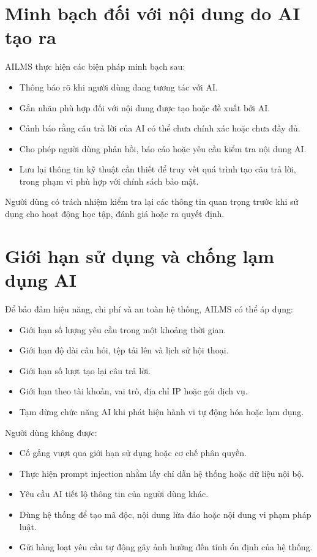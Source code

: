 \documentclass[12pt,a4paper]{article}
\begin{document}
\section{Minh bạch đối với nội dung do AI tạo ra}

AILMS thực hiện các biện pháp minh bạch sau:

\begin{itemize}
    \item Thông báo rõ khi người dùng đang tương tác với AI.
    \item Gắn nhãn phù hợp đối với nội dung được tạo hoặc đề xuất bởi AI.
    \item Cảnh báo rằng câu trả lời của AI có thể chưa chính xác hoặc chưa đầy đủ.
    \item Cho phép người dùng phản hồi, báo cáo hoặc yêu cầu kiểm tra nội dung AI.
    \item Lưu lại thông tin kỹ thuật cần thiết để truy vết quá trình tạo câu trả lời,
    trong phạm vi phù hợp với chính sách bảo mật.
\end{itemize}

Người dùng có trách nhiệm kiểm tra lại các thông tin quan trọng trước khi sử dụng
cho hoạt động học tập, đánh giá hoặc ra quyết định.

\section{Giới hạn sử dụng và chống lạm dụng AI}

Để bảo đảm hiệu năng, chi phí và an toàn hệ thống, AILMS có thể áp dụng:

\begin{itemize}
    \item Giới hạn số lượng yêu cầu trong một khoảng thời gian.
    \item Giới hạn độ dài câu hỏi, tệp tải lên và lịch sử hội thoại.
    \item Giới hạn số lượt tạo lại câu trả lời.
    \item Giới hạn theo tài khoản, vai trò, địa chỉ IP hoặc gói dịch vụ.
    \item Tạm dừng chức năng AI khi phát hiện hành vi tự động hóa hoặc lạm dụng.
\end{itemize}

Người dùng không được:

\begin{itemize}
    \item Cố gắng vượt qua giới hạn sử dụng hoặc cơ chế phân quyền.
    \item Thực hiện prompt injection nhằm lấy chỉ dẫn hệ thống hoặc dữ liệu nội bộ.
    \item Yêu cầu AI tiết lộ thông tin của người dùng khác.
    \item Dùng hệ thống để tạo mã độc, nội dung lừa đảo hoặc nội dung vi phạm pháp luật.
    \item Gửi hàng loạt yêu cầu tự động gây ảnh hưởng đến tính ổn định của hệ thống.
\end{itemize}
\end{document}
